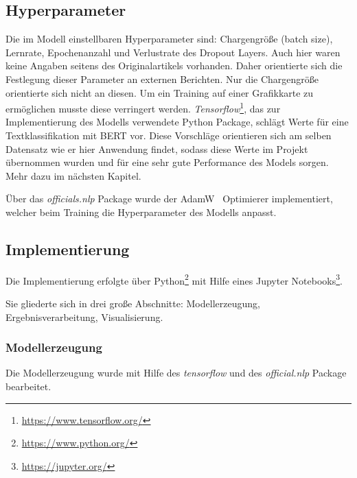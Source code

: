\documentclass[DIV=13,fontsize=11pt]{scrartcl}
\begin{document}
\subsection{Hyperparameter}
Die im Modell einstellbaren Hyperparameter sind: Chargengröße (batch size), Lernrate, Epochenanzahl und Verlustrate des Dropout Layers.
Auch hier waren keine Angaben seitens des Originalartikels vorhanden. Daher orientierte sich die Festlegung dieser Parameter an
externen Berichten. Nur die Chargengröße orientierte sich nicht an diesen. Um ein Training auf einer Grafikkarte zu ermöglichen
musste diese verringert werden.
\textit{Tensorflow}\footnote{\url{https://www.tensorflow.org/}}, das zur Implementierung des Modells verwendete Python Package,
schlägt Werte für eine Textklassifikation mit BERT vor. Diese Vorschläge orientieren sich am selben Datensatz wie er hier Anwendung findet,
sodass diese Werte im Projekt übernommen wurden und für eine sehr gute Performance des Models sorgen. Mehr dazu im nächsten Kapitel.

Über das \textit{officials.nlp} Package wurde der AdamW~\cite{DBLP:journals/corr/abs-1711-05101} Optimierer implementiert,
welcher beim Training die Hyperparameter des Modells anpasst.

\subsection{Implementierung}

Die Implementierung erfolgte über Python\footnote{\url{https://www.python.org/}} mit
Hilfe eines Jupyter Notebooks\footnote{\url{https://jupyter.org/}}.

Sie gliederte sich in drei große Abschnitte: Modellerzeugung, Ergebnisverarbeitung, Visualisierung.

\subsubsection{Modellerzeugung}

Die Modellerzeugung wurde mit Hilfe des \textit{tensorflow} und des \textit{official.nlp} Package bearbeitet.
\end{document}
